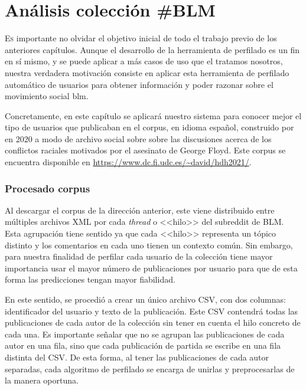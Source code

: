\chapter{Análisis colección \#BLM}
\label{chap:blm}

\lettrine{E}{s} importante no olvidar el objetivo inicial de todo el trabajo previo de los anteriores capítulos. Aunque el desarrollo de la herramienta de perfilado es un fin en sí mismo, y se puede aplicar a más casos de uso que el tratamos nosotros, nuestra verdadera motivación consiste en aplicar esta herramienta de perfilado automático de usuarios para obtener información y poder razonar sobre el movimiento social \acrshort{blm}.

Concretamente, en este capítulo se aplicará nuestro sistema para conocer mejor el tipo de usuarios que publicaban en el corpus, en idioma español, construido por \citet{heritage_BLM} en 2020 a modo de archivo social sobre sobre las discusiones acerca de los conflictos raciales motivados por el asesinato de George Floyd. Este corpus se encuentra disponible en \url{https://www.dc.fi.udc.es/~david/hdh2021/}.

\subsection{Procesado corpus}

Al descargar el corpus de la dirección anterior, este viene distribuido entre múltiples archivos XML por cada \textit{thread} o <<hilo>> del subreddit de BLM. Esta agrupación tiene sentido ya que cada <<hilo>> representa un tópico distinto y los comentarios en cada uno tienen un contexto común. Sin embargo, para nuestra finalidad de perfilar cada usuario de la colección tiene mayor importancia usar el mayor número de publicaciones por usuario para que de esta forma las predicciones tengan mayor fiabilidad.


En este sentido, se procedió a crear un único archivo CSV, con dos columnas: identificador del usuario y texto de la publicación. Este CSV contendrá todas las publicaciones de cada autor de la colección sin tener en cuenta el hilo concreto de cada una. Es importante señalar que no se agrupan las publicaciones de cada autor en una fila, sino que cada publicación de partida se escribe en una fila distinta del CSV. De esta forma, al tener las publicaciones de cada autor separadas, cada algoritmo de perfilado se encarga de unirlas y preprocesarlas de la manera oportuna.

